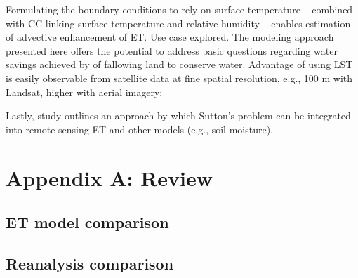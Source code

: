\documentclass{article}
\begin{document}
    Formulating the boundary conditions to rely on surface temperature -- combined with CC linking surface temperature and relative humidity -- enables estimation of advective enhancement of ET.
    Use case explored. 
    The modeling approach presented here offers the potential to address basic questions regarding water savings achieved by of fallowing land to conserve water.
    Advantage of using LST is easily observable from satellite data at fine spatial resolution, e.g., 100 m with Landsat, higher with aerial imagery;

    Lastly, study outlines an approach by which Sutton's problem  can be integrated into remote sensing ET and other models (e.g., soil moisture).

    \section*{Appendix A: Review }

    \subsection{ET model comparison}
    \subsection{Reanalysis comparison }
\end{document}
